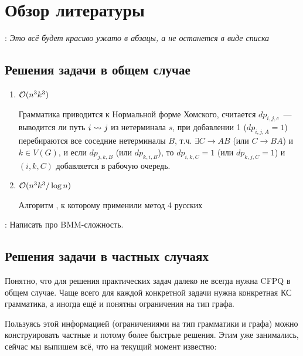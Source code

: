 \section{Обзор литературы}



\TODO: \textit{Это всё будет красиво ужато в абзацы, а не останется в виде списка}

\subsection{Решения задачи в общем случае}

\begin{enumerate}
    \item $\mathcal{O}(n^3 k^3)$ \cite{Reps97}

    Грамматика приводится к Нормальной форме Хомского, считается $dp_{i,j,c}$~--- выводится ли путь $i \rightsquigarrow j$ из нетерминала $s$, при добавлении 1 ($dp_{i,j,A} = 1$) перебираются все соседние нетерминалы $B$, т.ч. $\exists C \to AB$ (или $C \to BA$) и $k \in V(G)$, и если $dp_{j, k, B}$ (или $dp_{k, i, B}$), то $dp_{i, k, C} = 1$ (или $dp_{k, j, C} = 1$) и $(i, k, C)$ добавляется в рабочую очередь.

    \item $\mathcal{O}(n^3 k^3 / \log n)$ \cite{Chaudhuri08}

    Алгоритм \cite{Reps97}, к которому применили метод 4 русских

\end{enumerate}

\TODO: Написать про BMM-сложность.

\subsection{Решения задачи в частных случаях}

Понятно, что для решения практических задач далеко не всегда нужна CFPQ в общем случае. Чаще всего для каждой конкретной задачи нужна конкретная КС грамматика, а иногда ещё и понятны ограничения на тип графа.

Пользуясь этой информацией (ограничениями на тип грамматики и графа) можно конструировать частные и потому более быстрые решения. Этим уже занимались, сейчас мы выпишем всё, что на текущий момент известно:

